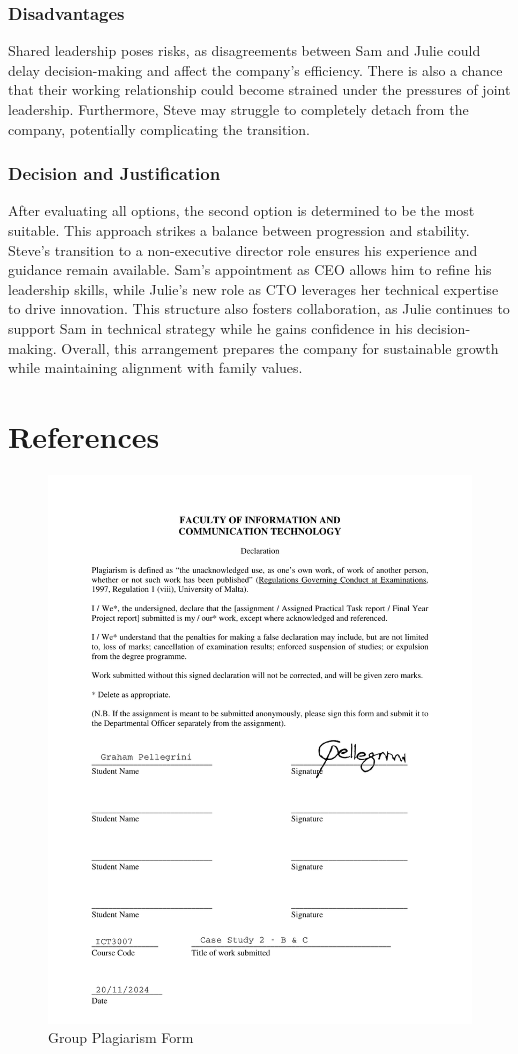 \documentclass[a4paper,10pt]{article}
\begin{document}
\subsubsection*{Disadvantages}
Shared leadership poses risks, as disagreements between Sam and Julie could delay decision-making and affect the company’s efficiency. There is also a chance that their working relationship could become strained under the pressures of joint leadership. Furthermore, Steve may struggle to completely detach from the company, potentially complicating the transition.

\subsubsection*{Decision and Justification}

After evaluating all options, the second option is determined to be the most suitable. This approach strikes a balance between progression and stability. Steve’s transition to a non-executive director role ensures his experience and guidance remain available. Sam’s appointment as CEO allows him to refine his leadership skills, while Julie’s new role as CTO leverages her technical expertise to drive innovation. This structure also fosters collaboration, as Julie continues to support Sam in technical strategy while he gains confidence in his decision-making. Overall, this arrangement prepares the company for sustainable growth while maintaining alignment with family values.


\section{References}

\pagebreak
\begin{figure}[h]
    \centering
    \includegraphics[width=1\textwidth]{Group_Plagiarism_Form.pdf}
    \caption{Group Plagiarism Form}
\end{figure}
\end{document}
